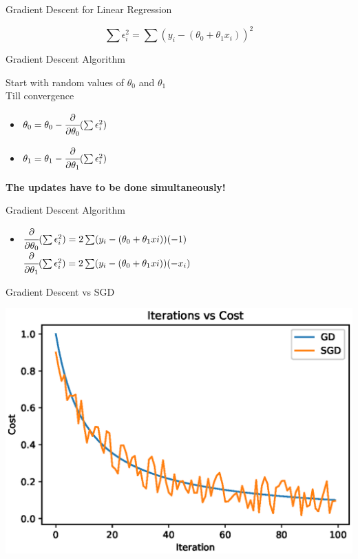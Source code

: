 \documentclass{beamer}
\begin{document}
	

	
	
	

	
	\begin{frame}{Gradient Descent for Linear Regression}
		
		\begin{equation*}
		\sum \epsilon_{i}^{2} = \sum (y_{i} - (\theta_{0} + \theta_{1}x_{i}))^{2}
		\end{equation*}
		
	\end{frame}
	
	\begin{frame}{Gradient Descent Algorithm}
		
		Start with random values of $\theta_{0}$ and $\theta_{1}$\\
		Till convergence
		\begin{itemize}
			\item $\theta_{0} = \theta_{0} - \cfrac{\partial}{\partial \theta_{0}} (\sum \epsilon_{i}^{2}) $
			\item $\theta_{1} = \theta_{1} - \cfrac{\partial}{\partial \theta_{1}} (\sum \epsilon_{i}^{2}) $
		\end{itemize}
		
		\textbf{The updates have to be done simultaneously!}
	\end{frame}
	
	\begin{frame}{Gradient Descent Algorithm}
		
		\begin{itemize}
			\item $\cfrac{\partial}{\partial \theta_{0}} (\sum \epsilon_{i}^{2}) = 2\sum (y_{i} - (\theta_{0} + \theta_{1}x{i}))(-1)$
			$\cfrac{\partial}{\partial \theta_{1}} (\sum \epsilon_{i}^{2}) = 2\sum (y_{i} - (\theta_{0} + \theta_{1}x{i}))(-x_{i})$
		\end{itemize}
	\end{frame}
	
	\begin{frame}{Gradient Descent vs SGD}
		\begin{center}
			\includegraphics[totalheight=6cm]{gradient-descent/gd-sgd.eps}
		\end{center}
	\end{frame}
	
\end{document}
